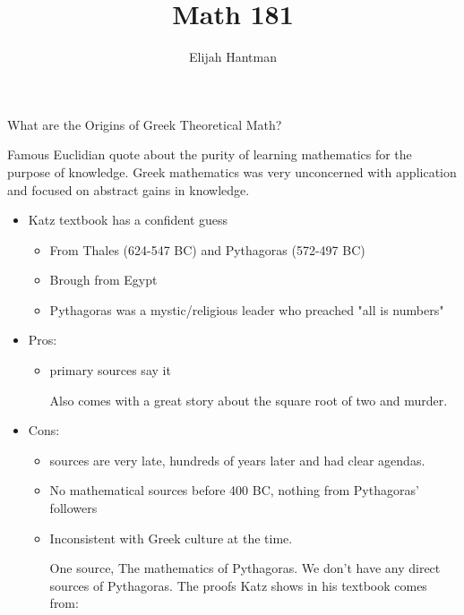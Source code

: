 \documentclass{report}
\title{\Huge{Math 181}}
\author{\huge{Elijah Hantman}}
\date{}
\begin{document}
\maketitle
\newpage

\begin{description}
    \item What are the Origins of Greek Theoretical Math? 
        \begin{mdframed}
            Famous Euclidian quote about the purity
            of learning mathematics for the purpose of
            knowledge. Greek mathematics was very unconcerned
            with application and focused on abstract
            gains in knowledge.

            \begin{itemize}
                \item Katz textbook has a confident guess
                    \begin{itemize}
                        \item From Thales (624-547 BC)
                            and Pythagoras (572-497 BC)
                        \item Brough from Egypt
                        \item Pythagoras was a mystic/religious
                            leader who preached "all is numbers"
                    \end{itemize}
                \item Pros:
                    \begin{itemize}
                        \item primary sources say it
                            \begin{mdframed}
                                Also comes with a great
                                story about the square
                                root of two and murder.
                            \end{mdframed}
                    \end{itemize}
                \item Cons:
                    \begin{itemize}
                        \item  sources are very late, hundreds
                            of years later and had clear 
                            agendas.
                        \item No mathematical sources before
                            400 BC, nothing from Pythagoras'
                            followers
                        \item Inconsistent with Greek culture
                            at the time.
                            \begin{mdframed}
                                One source, The mathematics
                                of Pythagoras. We don't have any
                                direct sources of Pythagoras.
                                The proofs Katz shows in his
                                textbook comes from:


\end{mdframed}
\end{itemize}
\end{itemize}
\end{mdframed}
\end{description}
\end{document}
